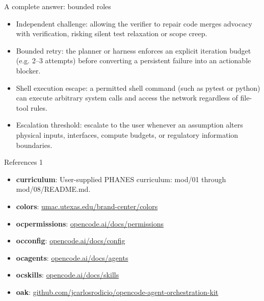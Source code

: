 \documentclass[aspectratio=169,11pt]{beamer}
\begin{document}
\begin{frame}[t,fragile]{A complete answer: bounded roles}
\fontsize{11.5}{14}\selectfont
\begin{itemize}\setlength{\itemsep}{2mm}
\item Independent challenge: allowing the verifier to repair code merges advocacy with verification, risking silent test relaxation or scope creep.
\item Bounded retry: the planner or harness enforces an explicit iteration budget (e.g. 2--3 attempts) before converting a persistent failure into an actionable blocker.
\item Shell execution escape: a permitted shell command (such as pytest or python) can execute arbitrary system calls and access the network regardless of file-tool rules.
\item Escalation threshold: escalate to the user whenever an assumption alters physical inputs, interfaces, compute budgets, or regulatory information boundaries.
\end{itemize}
\end{frame}
\begin{frame}[t]{References 1}
\fontsize{9}{12}\selectfont\begin{itemize}\setlength{\itemsep}{3mm}
\item \textbf{curriculum}: User-supplied PHANES curriculum: mod/01 through mod/08/README.md.
\item \textbf{colors}: \href{https://umac.utexas.edu/brand-center/colors/}{umac.utexas.edu/brand-center/colors}
\item \textbf{ocpermissions}: \href{https://opencode.ai/docs/permissions/}{opencode.ai/docs/permissions}
\item \textbf{occonfig}: \href{https://opencode.ai/docs/config/}{opencode.ai/docs/config}
\item \textbf{ocagents}: \href{https://opencode.ai/docs/agents/}{opencode.ai/docs/agents}
\item \textbf{ocskills}: \href{https://opencode.ai/docs/skills/}{opencode.ai/docs/skills}
\item \textbf{oak}: \href{https://github.com/jcarlosrodicio/opencode-agent-orchestration-kit}{github.com/jcarlosrodicio/opencode-agent-orchestration-kit}
\end{itemize}\end{frame}
\end{document}
